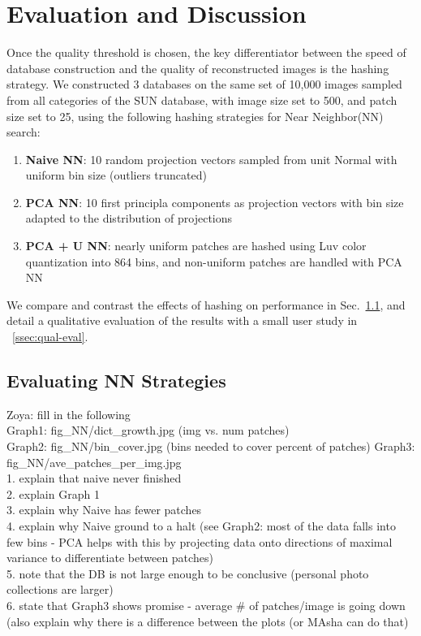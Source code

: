 \section{Evaluation and Discussion}\label{sec:performance}

Once the quality threshold is chosen, the key differentiator
between the speed of database construction and the quality of
reconstructed images is the hashing strategy.
We constructed 3 databases on the same set of
10,000 images sampled
from all categories of the SUN database, with image size
set to 500, and patch size set to 25, using the following
hashing strategies for Near Neighbor(NN) search:\\
\begin{enumerate}
\item \textbf{Naive NN}: 10 random projection vectors sampled from unit Normal with
uniform bin size (outliers truncated)
\item \textbf{PCA NN}: 10 first principla components as projection vectors with
bin size adapted to the distribution of projections
\item \textbf{PCA + U NN}: nearly uniform patches are hashed using Luv color
quantization into 864 bins, and non-uniform patches are handled with PCA NN
\end{enumerate}
We compare and contrast the effects of hashing on performance in
Sec.~\ref{ssec:nn-eval}, and detail a qualitative evaluation of
the results with a small user study in ~\ref{ssec:qual-eval}.

\subsection{Evaluating NN Strategies}\label{ssec:nn-eval}



\begin{edit}
Zoya: fill in the following\\
Graph1: fig\_NN/dict\_growth.jpg (img vs. num patches)\\
Graph2: fig\_NN/bin\_cover.jpg (bins needed to cover percent of patches)
Graph3: fig\_NN/ave\_patches\_per\_img.jpg\\
1. explain that naive never finished \\
2. explain Graph 1 \\
3. explain why Naive has fewer patches \\
4. explain why Naive ground to a halt (see Graph2: most of the data falls into
few bins - PCA helps with this by projecting data onto directions
of maximal variance to differentiate between patches) \\
5. note that the DB is not large enough to be conclusive
(personal photo collections are larger)\\
6. state that Graph3 shows promise - average \# of patches/image is going down
(also explain why there is a difference between the plots (or MAsha can do that)
\end{edit}

